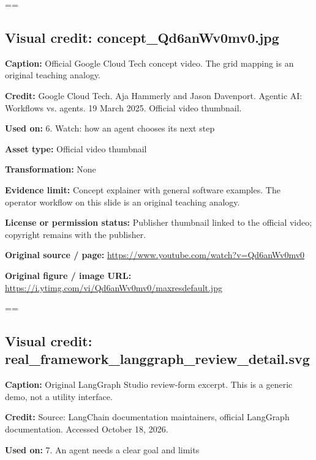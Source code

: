 \documentclass[10pt,letterpaper]{article}
\begin{document}
\setbox\readingEntry=\vbox\bgroup\hsize=\linewidth\subsection*{Visual credit: concept\_Qd6anWv0mv0.jpg}
\textbf{Caption:} Official Google Cloud Tech concept video. The grid mapping is an original teaching analogy.\par
\textbf{Credit:} Google Cloud Tech. Aja Hammerly and Jason Davenport. Agentic AI: Workflows vs. agents. 19 March 2025. Official video thumbnail.\par
\textbf{Used on:} 6. Watch: how an agent chooses its next step\par
\textbf{Asset type:} Official video thumbnail\par
\textbf{Transformation:} None\par
\textbf{Evidence limit:} Concept explainer with general software examples. The operator workflow on this slide is an original teaching analogy.\par
\textbf{License or permission status:} Publisher thumbnail linked to the official video; copyright remains with the publisher.\par
\textbf{Original source / page:} \href{https://www.youtube.com/watch?v=Qd6anWv0mv0}{\small\ttfamily https:/\allowbreak{}/\allowbreak{}www.\allowbreak{}youtube.\allowbreak{}com/\allowbreak{}watch?\allowbreak{}v=\allowbreak{}Qd6anWv0mv0}\par
\textbf{Original figure / image URL:} \href{https://i.ytimg.com/vi/Qd6anWv0mv0/maxresdefault.jpg}{\small\ttfamily https:/\allowbreak{}/\allowbreak{}i.\allowbreak{}ytimg.\allowbreak{}com/\allowbreak{}vi/\allowbreak{}Qd6anWv0mv0/\allowbreak{}maxresdefault.\allowbreak{}jpg}\par
\egroup\par\noindent\box\readingEntry\par\medskip
\setbox\readingEntry=\vbox\bgroup\hsize=\linewidth\subsection*{Visual credit: real\_framework\_langgraph\_review\_detail.svg}
\textbf{Caption:} Original LangGraph Studio review-form excerpt. This is a generic demo, not a utility interface.\par
\textbf{Credit:} Source: LangChain documentation maintainers, official LangGraph documentation. Accessed October 18, 2026.\par
\textbf{Used on:} 7. An agent needs a clear goal and limits\par
\end{document}
